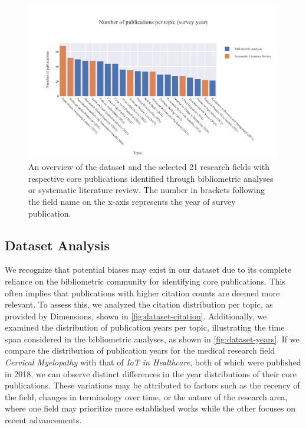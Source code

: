 \begin{figure}
	\centering	
	\includegraphics[scale=0.75]{pics/dataset-overview.pdf}
	\caption[Dataset overview of the research topics]{An overview of the dataset and the selected 21 research fields with respective core publications identified through bibliometric analyses or systematic literature review. The number in brackets following the field name on the x-axis represents the year of survey publication.}
	\label{fig:dataset-overview}
\end{figure}


\subsection{Dataset Analysis}

We recognize that potential biases may exist in our dataset due to its complete reliance on the bibliometric community for identifying core publications. This often implies that publications with higher citation counts are deemed more relevant. To assess this, we analyzed the citation distribution per topic, as provided by Dimensions, shown in \autoref{fig:dataset-citation}. Additionally, we examined the distribution of publication years per topic, illustrating the time span considered in the bibliometric analyses, as shown in \autoref{fig:dataset-years}.  If we compare the distribution of publication years for the medical research field \textit{Cervical Myelopathy} with that of \textit{IoT in Healthcare}, both of which were published in 2018, we can observe distinct differences in the year distributions of their core publications. These variations may be attributed to factors such as the recency of the field, changes in terminology over time, or the nature of the research area, where one field may prioritize more established works while the other focuses on recent advancements.


